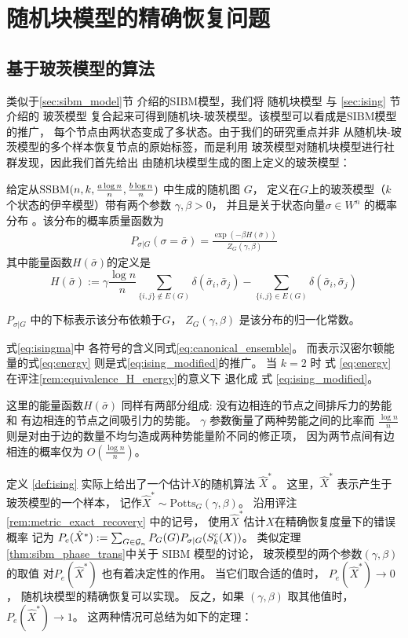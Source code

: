 
\chapter{随机块模型的精确恢复问题}


\section{基于玻茨模型的算法}
类似于\ref{sec:sibm_model}节
介绍的SIBM模型，我们将
随机块模型
与 \ref{sec:ising} 节介绍的 玻茨模型
复合起来可得到随机块-玻茨模型。该模型可以看成是SIBM模型的推广，
每个节点由两状态变成了多状态。由于我们的研究重点并非
从随机块-玻茨模型的多个样本恢复节点的原始标签，而是利用
玻茨模型对随机块模型进行社群发现，因此我们首先给出
由随机块模型生成的图上定义的玻茨模型：
\begin{definition}\label{def:ising}
	给定从$\operatorname{SSBM}(n,k,\frac{a \log n}{n},\frac{b \log n}{n})$ 中生成的随机图 $G$，
    定义在$G$上的玻茨模型（$k$个状态的伊辛模型）带有两个参数 $\gamma,\beta>0$，
	并且是关于状态向量$\sigma\in W^n$ 的概率分布
。该分布的概率质量函数为
\begin{align} \label{eq:isingma}
	P_{\sigma|G}(\sigma=\bar{\sigma})=\frac{\exp(-\beta H(\bar{\sigma}))}{Z_G(\gamma,\beta)}
	\end{align}
其中能量函数$H(\bar{\sigma})$的定义是
\begin{equation}\label{eq:energy}
	H(\bar{\sigma}) := \gamma \frac{\log n}{n} \sum_{\{i,j\}\not\in E(G)} \delta(\bar{\sigma}_i, \bar{\sigma}_j)
	- \sum_{\{i,j\}\in E(G)} \delta(\bar{\sigma}_i, \bar{\sigma}_j)
	\end{equation}
	
	$P_{\sigma|G}$ 中的下标表示该分布依赖于$G$，
    $Z_G(\gamma,\beta)$ 是该分布的归一化常数。
\end{definition}

式\eqref{eq:isingma}中
各符号的含义同式\eqref{eq:canonical_ensemble}。
而表示汉密尔顿能量的式\eqref{eq:energy}
则是式\eqref{eq:ising_modified}的推广。
当  $k=2$ 时 式 \eqref{eq:energy}
在评注\ref{rem:equivalence_H_energy}的意义下
退化成 式 \eqref{eq:ising_modified}。 

这里的能量函数$H(\bar{\sigma})$ 同样有两部分组成:
没有边相连的节点之间排斥力的势能和
有边相连的节点之间吸引力的势能。
$\gamma$ 参数衡量了两种势能之间的比率而
$\frac{\log n}{n}$ 则是对由于边的数量不均匀造成两种势能量阶不同的修正项，
因为两节点间有边相连的概率仅为 $O(\frac{\log n}{n})$。

定义 \ref{def:ising} 实际上给出了一个估计$X$的随机算法 $\hat{X}^*$。
这里，$\hat{X}^*$ 表示产生于玻茨模型的一个样本，
记作$\hat{X}^* \sim \textrm{Potts}_G(\gamma, \beta)$。
沿用评注\ref{rem:metric_exact_recovery} 中的记号，
使用$\hat{X}^*$估计$X$在精确恢复度量下的错误概率
记为 $P_e(\hat{X}^*) := \sum_{G \in \mathcal{G}_n} P_G(G) P_{\sigma | G}(S^c_k(X))$。
类似定理\ref{thm:sibm_phase_trans}中关于 SIBM 模型的讨论，
玻茨模型的两个参数$(\gamma, \beta)$ 的取值
对$P_e(\hat{X}^*)$
也有着决定性的作用。
当它们取合适的值时， 
$ P_e(\hat{X}^*)\to 0$，
随机块模型的精确恢复可以实现。
反之，如果 $(\gamma, \beta)$ 取其他值时，
$P_e(\hat{X}^*) \to 1$。
这两种情况可总结为如下的定理：

